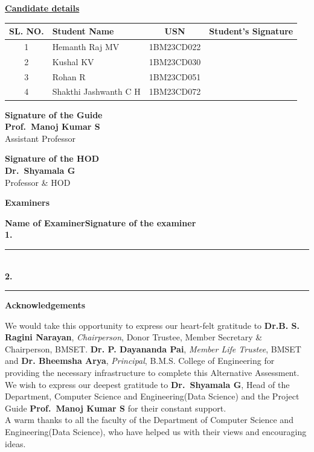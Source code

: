 \documentclass[12pt,a4paper]{report}
\newcommand{\GuideName}{Prof.~Manoj Kumar S}
\newcommand{\GuideDesignation}{Assistant Professor}
\newcommand{\HODName}{Dr.~Shyamala G}
\newcommand{\StudentRows}{%
  1 & Hemanth Raj MV & 1BM23CD022 & \\ \hline
  2 & Kushal KV & 1BM23CD030 & \\ \hline
  3 & Rohan R & 1BM23CD051 & \\ \hline
  4 & Shakthi Jashwanth C H & 1BM23CD072 & \\ \hline}
\begin{document}
\begin{center}
\textbf{\underline{Candidate details}}\\[4pt]
\renewcommand{\arraystretch}{1.1}
\begin{tabular}{|c|p{5.6cm}|c|c|}
\hline
\textbf{SL. NO.} & \textbf{Student Name} & \textbf{USN} & \textbf{Student's Signature} \\ \hline
\StudentRows
\end{tabular}
\end{center}
\vspace{4pt}
\noindent\begin{minipage}[t]{0.5\textwidth}
\textbf{Signature of the Guide}\\[6pt]
\textbf{\GuideName}\\
\GuideDesignation
\end{minipage}%
\begin{minipage}[t]{0.5\textwidth}\raggedleft
\textbf{Signature of the HOD}\\[6pt]
\textbf{\HODName}\\
Professor \& HOD
\end{minipage}

\vspace{8pt}
\begin{center}\textbf{Examiners}\end{center}\vspace{-6pt}
\noindent\textbf{Name of Examiner}\hfill\textbf{Signature of the examiner}\\[6pt]
\textbf{1.}\hfill\rule{4.6cm}{0.4pt}\\[6pt]
\textbf{2.}\hfill\rule{4.6cm}{0.4pt}
\clearpage

\begin{center}{\large\bfseries Acknowledgements}\end{center}
\noindent We would take this opportunity to express our heart-felt gratitude to \textbf{Dr.B. S. Ragini Narayan}, \textit{Chairperson}, Donor Trustee, Member Secretary \& Chairperson, BMSET. \textbf{Dr. P. Dayananda Pai}, \textit{Member Life Trustee}, BMSET and \textbf{Dr. Bheemsha Arya}, \textit{Principal}, B.M.S. College of Engineering for providing the necessary infrastructure to complete this Alternative Assessment.\\
We wish to express our deepest gratitude to \textbf{\HODName}, Head of the Department, Computer Science and Engineering(Data Science) and the Project Guide \textbf{\GuideName} for their constant support.\\
A warm thanks to all the faculty of the Department of Computer Science and Engineering(Data Science), who have helped us with their views and encouraging ideas.
\clearpage
\end{document}
